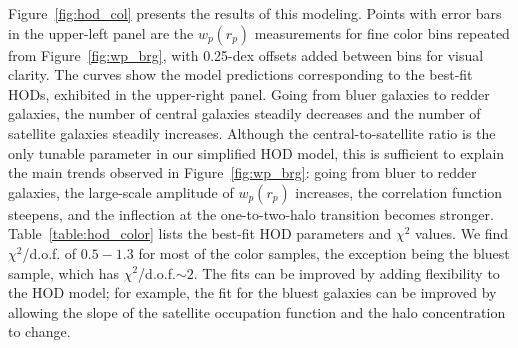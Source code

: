 \documentclass[]{emulateapj}
\newcommand{\wrp}{{w_p(r_p)}}
\begin{document}
Figure~\ref{fig:hod_col} presents the results of this modeling.
Points with error bars in the upper-left panel
are the $\wrp$ measurements for fine color
bins repeated from Figure~\ref{fig:wp_brg}, with 0.25-dex offsets
added between bins for visual clarity.
The curves show the model predictions corresponding to the best-fit
HODs, exhibited in the upper-right panel.
Going from bluer galaxies to redder galaxies, the number of
central galaxies steadily decreases and the number of satellite
galaxies steadily increases.  Although the central-to-satellite
ratio is the only tunable parameter in our simplified HOD model,
this is sufficient to explain the main trends observed in
Figure~\ref{fig:wp_brg}: going from bluer to redder galaxies,
the large-scale amplitude of $\wrp$ increases, the correlation
function steepens, and the inflection at the one-to-two-halo transition
becomes stronger.  Table~\ref{table:hod_color} lists the best-fit
HOD parameters and $\chi^2$ values.  We find $\chi^2$/d.o.f. of
$0.5-1.3$ for most of the color samples, the exception being
the bluest sample, which has $\chi^2$/d.o.f.$\sim 2$.  The fits can be 
improved by adding flexibility to the HOD model; for example, the
fit for the bluest galaxies can be improved by allowing the slope of 
the satellite occupation function and the halo concentration to change. 

\begin{figure*}[tbp]
\caption[]{\label{fig:hod_col}
HOD models of the correlation function in fine color bins of the
$-20 < M_r < -19$ sample.  See text for description of the HOD modeling.  
The top-left panel shows the measured $\wrp$ and the best-fit HOD models. 
Offsets of 0.25 dex are added for visual clarity, with 
the bluest galaxies at the bottom.
The top-right panel presents the corresponding mean
occupation functions, $\langle N(M_h)\rangle$, color-coded in the same way, 
with dashed and dotted lines showing contributions of 
central and satellite galaxies, respectively.
The bottom-right panel shows the same halo occupation functions normalized
so that their central galaxy occupation functions coincide.
The bottom-left panel shows the satellite fraction 
versus median halo mass for these color subsamples.
Each colored ``streak'' shows results for models acceptable
at the $\Delta\chi^2 < 1$ level; since the models have only
one adjustable parameter, the uncertainty in this parameter
produces a one-dimensional locus in this two-dimensional plane.
}
\end{figure*}
\end{document}
